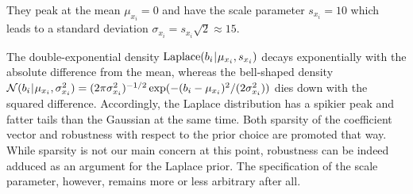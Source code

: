 They peak at the mean \(\mu_{x_i} = 0\) and have the scale parameter \(s_{x_i} = 10\) which leads to a standard deviation \(\sigma_{x_i} = s_{x_i} \sqrt{2} \approx 15\).
\par %
The double-exponential density \(\mathrm{Laplace}(b_i {\:\!}|{\:\!} \mu_{x_i},s_{x_i})\) decays exponentially with the absolute difference from the mean, whereas the bell-shaped density
\(\mathcal{N}(b_i {\:\!}|{\:\!} \mu_{x_i},\sigma_{x_i}^2) = (2 \pi \sigma_{x_i}^2)^{-1/2} \exp( - (b_i-\mu_{x_i})^2 / (2\sigma_{x_i}^2) )\) dies down with the squared difference.
Accordingly, the Laplace distribution has a spikier peak and fatter tails than the Gaussian at the same time.
Both sparsity of the coefficient vector and robustness with respect to the prior choice are promoted that way.
While sparsity is not our main concern at this point, robustness can be indeed adduced as an argument for the Laplace prior.
The specification of the scale parameter, however, remains more or less arbitrary after all.

